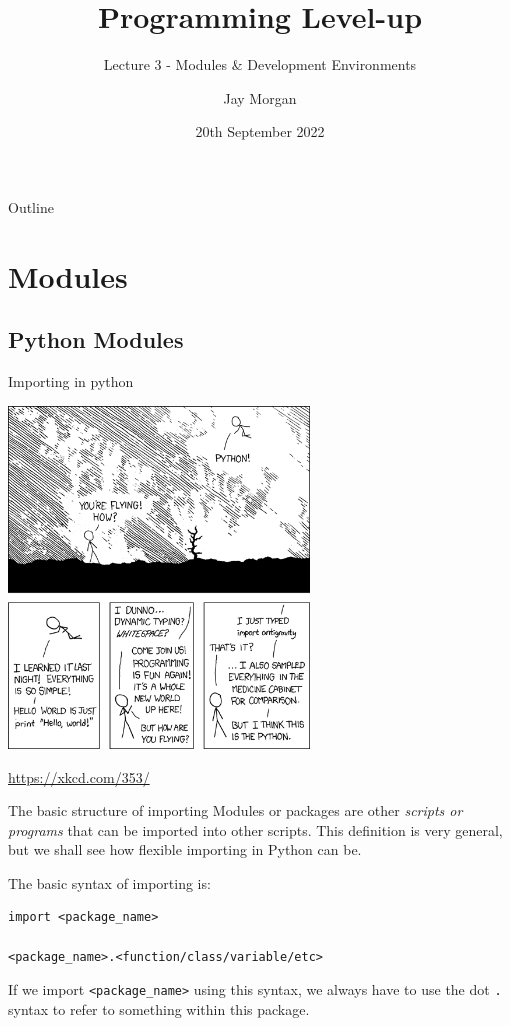 \documentclass[10pt]{beamer}
\author{Jay Morgan}
\date{20th September 2022}
\title{Programming Level-up}
\subtitle{Lecture 3 - Modules \& Development Environments}
\begin{document}
\maketitle
\begin{frame}{Outline}
\tableofcontents
\end{frame}


\section{Modules}
\label{sec:org0bc6020}

\subsection{Python Modules}
\label{sec:org3f2f229}

\begin{frame}[label={sec:org865a0e2}]{Importing in python}
\begin{center}
\includegraphics[width=0.6\textwidth]{images/python.png}
\end{center}
\url{https://xkcd.com/353/}
\end{frame}

\begin{frame}[label={sec:org7bc66f0},fragile]{The basic structure of importing}
 Modules or packages are other \emph{scripts or programs} that can be imported into other
scripts. This definition is very general, but we shall see how flexible importing in
Python can be.

The basic syntax of importing is:

\begin{verbatim}
import <package_name>

<package_name>.<function/class/variable/etc>
\end{verbatim}

If we import \texttt{<package\_name>} using this syntax, we always have to use the dot \texttt{.} syntax
to refer to something within this package.
\end{frame}
\end{document}
